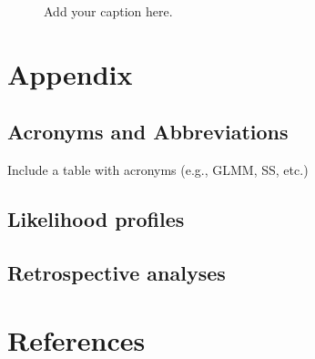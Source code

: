\documentclass[
]{scrartcl}
\begin{document}
\newpage{}

\begin{figure}


\caption{\label{fig-comp-cpue}Add your caption here.}

\end{figure}%

\newpage{}

\section{Appendix}\label{appendix}

\subsection{Acronyms and
Abbreviations}\label{acronyms-and-abbreviations}

Include a table with acronyms (e.g., GLMM, SS, etc.)

\subsection{Likelihood profiles}\label{likelihood-profiles}

\subsection{Retrospective analyses}\label{retrospective-analyses}

\newpage{}

\section*{References}\label{references}
\end{document}
